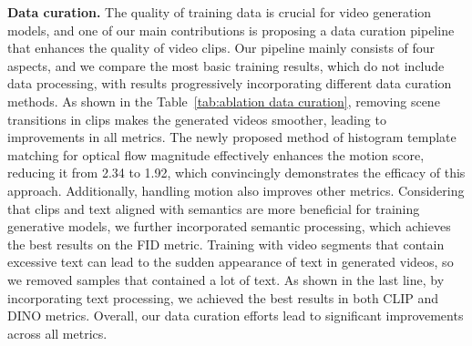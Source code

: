 \textbf{Data curation.} The quality of training data is crucial for video generation models, and one of our main contributions is proposing a data curation pipeline that enhances the quality of video clips. Our pipeline mainly consists of four aspects, and we compare the most basic training results, which do not include data processing, with results progressively incorporating different data curation methods. As shown in the Table~\ref{tab:ablation data curation}, removing scene transitions in clips makes the generated videos smoother, leading to improvements in all metrics. The newly proposed method of histogram template matching for optical flow magnitude effectively enhances the motion score, reducing it from 2.34 to 1.92, which convincingly demonstrates the efficacy of this approach. Additionally, handling motion also improves other metrics. Considering that clips and text aligned with semantics are more beneficial for training generative models, we further incorporated semantic processing, which achieves the best results on the FID metric. Training with video segments that contain excessive text can lead to the sudden appearance of text in generated videos, so we removed samples that contained a lot of text. As shown in the last line, by incorporating text processing, we achieved the best results in both CLIP and DINO metrics. Overall, our data curation efforts lead to significant improvements across all metrics.

\begin{table}[t]
\centering
{}
\caption{Ablations on step description. We also evaluate the performance of DC model with different step description. The generated videos have a resolution of 256$\times$384. ``Fusion” indicates using LLM to merge multiple descriptions, yielding the best training results. The default choice is colored in \colorbox[rgb]{0.9,0.9,0.9}{gray}. }
\label{tab:ablation prompt}
\end{table}

